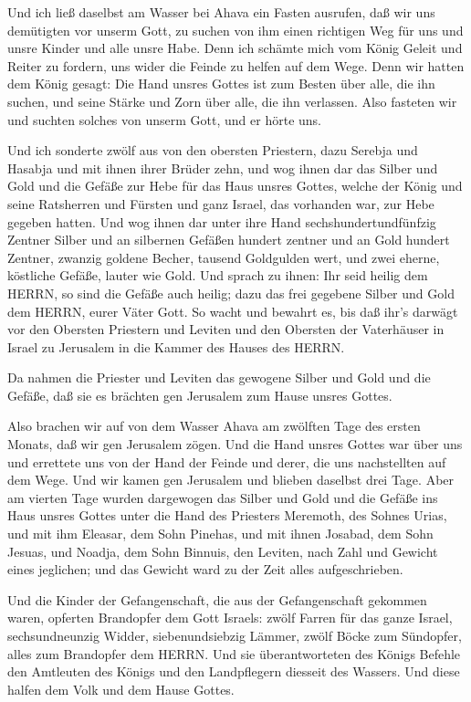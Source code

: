  Und ich ließ daselbst am Wasser bei Ahava ein Fasten
ausrufen, daß wir uns demütigten vor unserm Gott, zu suchen von ihm
einen richtigen Weg für uns und unsre Kinder und alle unsre Habe.
 Denn ich schämte mich vom König Geleit und Reiter zu
fordern, uns wider die Feinde zu helfen auf dem Wege. Denn wir hatten
dem König gesagt: Die Hand unsres Gottes ist zum Besten über alle, die
ihn suchen, und seine Stärke und Zorn über alle, die ihn verlassen.
 Also fasteten wir und suchten solches von unserm Gott, und
er hörte uns.

 Und ich sonderte zwölf aus von den obersten Priestern,
dazu Serebja und Hasabja und mit ihnen ihrer Brüder zehn, 
und wog ihnen dar das Silber und Gold und die Gefäße zur Hebe für das
Haus unsres Gottes, welche der König und seine Ratsherren und Fürsten
und ganz Israel, das vorhanden war, zur Hebe gegeben hatten.
 Und wog ihnen dar unter ihre Hand sechshundertundfünfzig
Zentner Silber und an silbernen Gefäßen hundert zentner und an Gold
hundert Zentner,  zwanzig goldene Becher, tausend
Goldgulden wert, und zwei eherne, köstliche Gefäße, lauter wie Gold.
 Und sprach zu ihnen: Ihr seid heilig dem HERRN, so sind
die Gefäße auch heilig; dazu das frei gegebene Silber und Gold dem
HERRN, eurer Väter Gott.  So wacht und bewahrt es, bis daß
ihr's darwägt vor den Obersten Priestern und Leviten und den Obersten
der Vaterhäuser in Israel zu Jerusalem in die Kammer des Hauses des
HERRN.

 Da nahmen die Priester und Leviten das gewogene Silber und
Gold und die Gefäße, daß sie es brächten gen Jerusalem zum Hause unsres
Gottes.

 Also brachen wir auf von dem Wasser Ahava am zwölften Tage
des ersten Monats, daß wir gen Jerusalem zögen. Und die Hand unsres
Gottes war über uns und errettete uns von der Hand der Feinde und derer,
die uns nachstellten auf dem Wege.  Und wir kamen gen
Jerusalem und blieben daselbst drei Tage.  Aber am vierten
Tage wurden dargewogen das Silber und Gold und die Gefäße ins Haus
unsres Gottes unter die Hand des Priesters Meremoth, des Sohnes Urias,
und mit ihm Eleasar, dem Sohn Pinehas, und mit ihnen Josabad, dem Sohn
Jesuas, und Noadja, dem Sohn Binnuis, den Leviten,  nach
Zahl und Gewicht eines jeglichen; und das Gewicht ward zu der Zeit alles
aufgeschrieben.

 Und die Kinder der Gefangenschaft, die aus der
Gefangenschaft gekommen waren, opferten Brandopfer dem Gott Israels:
zwölf Farren für das ganze Israel, sechsundneunzig Widder,
siebenundsiebzig Lämmer, zwölf Böcke zum Sündopfer, alles zum Brandopfer
dem HERRN.  Und sie überantworteten des Königs Befehle den
Amtleuten des Königs und den Landpflegern diesseit des Wassers. Und
diese halfen dem Volk und dem Hause Gottes.

